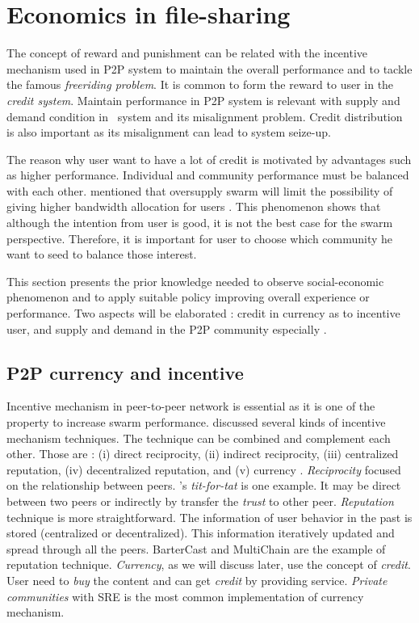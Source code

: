 \section{Economics in file-sharing}
The concept of reward and punishment can be related with the incentive mechanism used in P2P system to maintain the overall performance and to tackle the famous \textit{freeriding problem}. It is common to form the reward to user in the \textit{credit system}. Maintain performance in P2P system is relevant with supply and demand condition in \bt~system and its misalignment problem. Credit distribution is also important as its misalignment can lead to system seize-up.

The reason why user want to have a lot of credit is motivated by advantages such as higher performance. Individual and community performance must be balanced with each other. \citeauthor{2013:survivepriv:jia} mentioned that oversupply swarm will limit the possibility of giving higher bandwidth allocation for users \cite{2013:survivepriv:jia}. This phenomenon shows that although the intention from user is good, it is not the best case for the swarm perspective. Therefore, it is important for user to choose which community he want to seed to balance those interest.

This section presents the prior knowledge needed to observe social-economic phenomenon and to apply suitable policy improving overall experience or performance. Two aspects will be elaborated : credit in currency as to incentive user, and supply and demand in the P2P community especially \bt.

\subsection{P2P currency and incentive}
Incentive mechanism in peer-to-peer network is essential as it is one of the property to increase swarm performance. \citeauthor{2011:managesupplydemand:meulpolder} discussed several kinds of incentive mechanism techniques. The technique can be combined and complement each other. Those are : (i) direct reciprocity, (ii) indirect reciprocity, (iii) centralized reputation, (iv) decentralized reputation, and (v) currency \cite{2011:managesupplydemand:meulpolder}. \textit{Reciprocity} focused on the relationship between peers. \bt's \textit{tit-for-tat} is one example. It may be direct between two peers or indirectly by transfer the \textit{trust} to other peer. \textit{Reputation} technique is more straightforward. The information of user behavior in the past is stored (centralized or decentralized). This information iteratively updated and spread through all the peers. BarterCast \cite{2009:bartercast:meulpolder} and MultiChain \cite{2015:multichain:norberhuis} are the example of reputation technique. \textit{Currency}, as we will discuss later, use the concept of \textit{credit}. User need to \textit{buy} the content and can get \textit{credit} by providing service. \textit{Private communities} with SRE is the most common implementation of currency mechanism.

